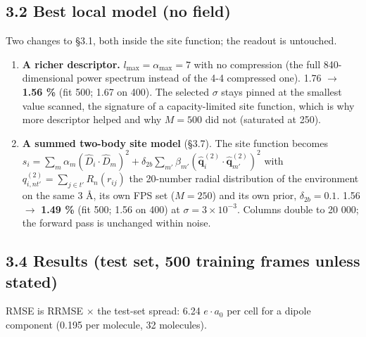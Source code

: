 \documentclass[11pt,a4paper]{article}
\providecommand{\tightlist}{\setlength{\itemsep}{0pt}\setlength{\parskip}{0pt}}
\begin{document}
\subsection{3.2 Best local model (no field)}\label{best-local-model-no-field}

Two changes to §3.1, both inside the site function; the readout is untouched.

\begin{enumerate}
\def\labelenumi{\arabic{enumi}.}
\tightlist
\item
  \textbf{A richer descriptor.} \(l_{\max}=\alpha_{\max}=7\) with no compression (the full
  840-dimensional power spectrum instead of the 4-4 compressed one). 1.76 \(\rightarrow\)
  \textbf{1.56 \%} (fit 500; 1.67 on 400). The selected \(\sigma\) stays pinned at the smallest
  value scanned, the signature of a capacity-limited site function, which is why more descriptor
  helped and why \(M=500\) did not (saturated at 250).
\item
  \textbf{A summed two-body site model} (§3.7). The site function becomes
  \(s_i=\sum_m\alpha_m(\hat D_i\!\cdot\!\hat D_m)^2+\delta_{2b}\sum_{m'}\beta_{m'}(\hat{\mathbf q}^{(2)}_i\!\cdot\!\hat{\mathbf q}^{(2)}_{m'})^2\)
  with \(q^{(2)}_{i,nt'}=\sum_{j\in t'}R_n(r_{ij})\) the 20-number radial distribution of the
  environment on the same 3 \AA{}, its own FPS set (\(M=250\)) and its own prior,
  \(\delta_{2b}=0.1\). 1.56 \(\rightarrow\) \textbf{1.49 \%} (fit 500; 1.56 on 400) at
  \(\sigma=3\times10^{-3}\). Columns double to 20 000; the forward pass is unchanged within noise.
\end{enumerate}

\subsection{3.4 Results (test set, 500 training frames unless
stated)}\label{results-test-set-500-training-frames-unless-stated}

RMSE is RRMSE \(\times\) the test-set spread: 6.24 \(e\cdot a_0\) per cell for a dipole component
(0.195 per molecule, 32 molecules).
\end{document}
